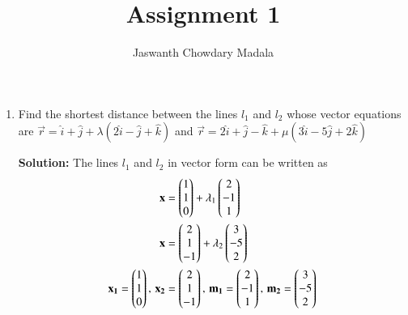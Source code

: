 \documentclass[journal,12pt,twocolumn]{IEEEtran}
\begin{document}
\vspace{3cm}


\title{Assignment 1}
\author{Jaswanth Chowdary Madala}





\maketitle

\newpage


\bigskip

\renewcommand{\thefigure}{\theenumi}
\renewcommand{\thetable}{\theenumi}

\begin{enumerate}
\item Find the shortest distance between the lines $l_1$ and $l_2$ whose vector equations are ${\overrightarrow{r} = \hat{i}+\hat{j}+\lambda(2\hat{i}-\hat{j}+\hat{k})}$ and ${\overrightarrow{r} = 2\hat{i}+\hat{j}-\hat{k}+\mu(3\hat{i}-5\hat{j}+2\hat{k})}$

\textbf{Solution:} The lines $l_1$ and $l_2$ in vector form can be written as
\begin{align}
\mathbf{x} &= \begin{pmatrix}1\\1\\0\end{pmatrix} + \lambda_1\begin{pmatrix}2\\-1\\1\end{pmatrix}\\
\mathbf{x} &= \begin{pmatrix}2\\1\\-1\end{pmatrix} + \lambda_2\begin{pmatrix}3\\-5\\2\end{pmatrix}\\
\mathbf{x_1} = \begin{pmatrix}1\\1\\0\end{pmatrix},\, \mathbf{x_2} &= \begin{pmatrix}2\\1\\-1\end{pmatrix}, \,\mathbf{m_1} = \begin{pmatrix}2\\-1\\1\end{pmatrix}, \, \mathbf{m_2} = \begin{pmatrix}3\\-5\\2\end{pmatrix}
\end{align}


\end{enumerate}
\end{document}
